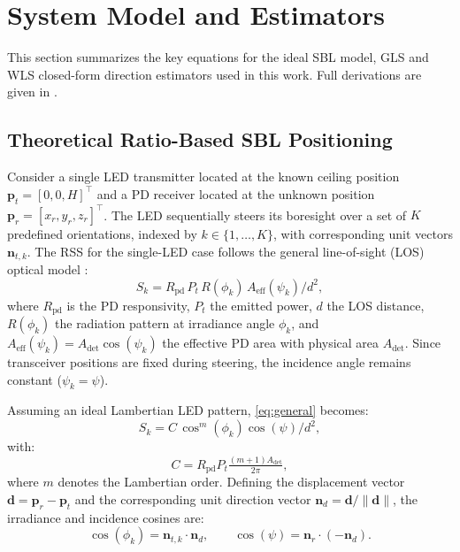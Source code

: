 \documentclass[conference]{IEEEtran}
\begin{document}
\section{System Model and Estimators}
\label{sec:system_model}

This section summarizes the key equations for the ideal SBL model, GLS and WLS closed-form direction estimators used in this work. Full derivations are given in \cite{acuna2025model}.

\subsection{Theoretical Ratio-Based SBL Positioning}
\label{subsec:theoretical_sbl}

Consider a single LED transmitter located at the known ceiling position $\mathbf{p}_t=[0,0,H]^\top$ and a PD receiver located at the unknown position $\mathbf{p}_r=[x_r,y_r,z_r]^\top$. The LED sequentially steers its boresight over a set of $K$ predefined orientations, indexed by $k\in\{1,\ldots,K\}$, with corresponding unit vectors $\mathbf{n}_{t,k}$. The RSS for the single-LED case follows the general line-of-sight (LOS) optical model \cite{Kahn1997}:
\begin{equation}
    S_{k}=R_{\mathrm{pd}}\,P_t\,R(\phi_{k})\,A_{\mathrm{eff}}(\psi_k)/d^2,
    \label{eq:general}
\end{equation}
where $R_{\mathrm{pd}}$ is the PD responsivity, $P_t$ the emitted power, $d$ the LOS distance, $R(\phi_{k})$ the radiation pattern at irradiance angle $\phi_k$, and $A_{\mathrm{eff}}(\psi_k) = A_{\mathrm{det}}\cos(\psi_k)$ the effective PD area with physical area $A_{\mathrm{det}}$. Since transceiver positions are fixed during steering, the incidence angle remains constant ($\psi_k = \psi$).

Assuming an ideal Lambertian LED pattern, \eqref{eq:general} becomes:
\begin{equation}
    S_{k}=C\,\cos^m(\phi_{k})\cos(\psi)/d^2,
    \label{eq:sbl_lambertian}
\end{equation}
with:
\begin{equation}
    C=R_{\mathrm{pd}}P_t\tfrac{(m+1)A_{\mathrm{det}}}{2\pi},
    \label{eq:C_constant_sbl}
\end{equation}
where $m$ denotes the Lambertian order. Defining the displacement vector $\mathbf{d}=\mathbf{p}_r-\mathbf{p}_t$ and the corresponding unit direction vector $\mathbf{n}_d=\mathbf{d}/\|\mathbf{d}\|$, the irradiance and incidence cosines are:
\begin{equation}
    \cos(\phi_{k})=\mathbf{n}_{t,k}\cdot\mathbf{n}_d,\qquad
    \cos(\psi)=\mathbf{n}_r\cdot(-\mathbf{n}_d).
    \label{eq:cosines_sbl}
\end{equation}
\end{document}
